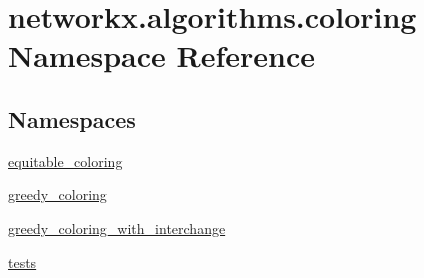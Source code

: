 \hypertarget{namespacenetworkx_1_1algorithms_1_1coloring}{}\section{networkx.\+algorithms.\+coloring Namespace Reference}
\label{namespacenetworkx_1_1algorithms_1_1coloring}
\subsection*{Namespaces}
\begin{DoxyCompactItemize}
\item 
 \hyperlink{namespacenetworkx_1_1algorithms_1_1coloring_1_1equitable__coloring}{equitable\+\_\+coloring}
\item 
 \hyperlink{namespacenetworkx_1_1algorithms_1_1coloring_1_1greedy__coloring}{greedy\+\_\+coloring}
\item 
 \hyperlink{namespacenetworkx_1_1algorithms_1_1coloring_1_1greedy__coloring__with__interchange}{greedy\+\_\+coloring\+\_\+with\+\_\+interchange}
\item 
 \hyperlink{namespacenetworkx_1_1algorithms_1_1coloring_1_1tests}{tests}
\end{DoxyCompactItemize}
